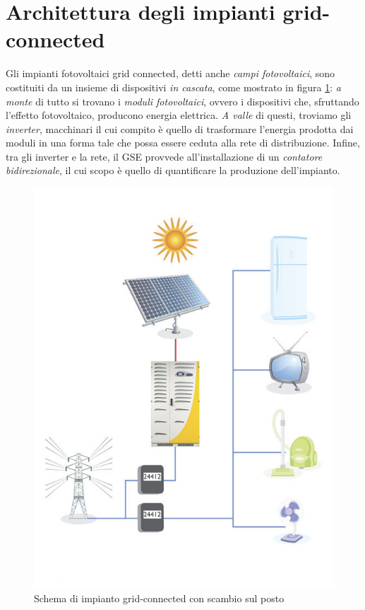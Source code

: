 %
\section{Architettura degli impianti grid-connected}
Gli impianti fotovoltaici grid connected, detti anche \emph{campi fotovoltaici}, 
sono costituiti da un insieme di dispositivi \emph{in cascata}, come mostrato in 
figura \ref{impiantogridconnect}: \emph{a monte} di tutto si trovano i \emph{moduli 
fotovoltaici}, ovvero i dispositivi che, sfruttando l'effetto fotovoltaico, 
producono energia elettrica. \emph{A valle} di questi, troviamo gli \emph{inverter}, 
macchinari il cui compito \`e quello di trasformare l'energia prodotta dai moduli 
in una forma tale che possa essere ceduta alla rete di distribuzione. Infine, tra 
gli inverter e la rete, il GSE provvede all'installazione di un \emph{contatore 
bidirezionale}, il cui scopo \`e quello di quantificare la produzione dell'impianto.
\begin{figure}[!h]
\centering
\includegraphics[width=350pt]{img/impianto-grid-connect.jpg}
\caption{Schema di impianto grid-connected con scambio sul posto}
\label{impiantogridconnect}
\end{figure}
%

